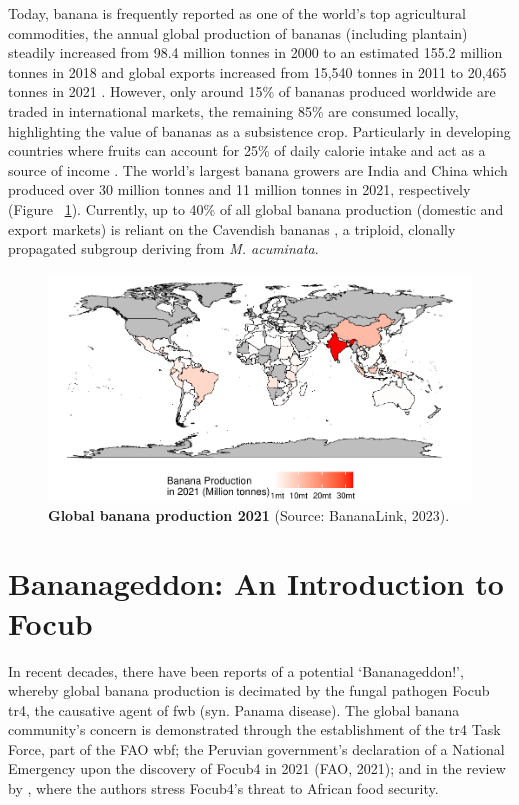 Today, banana is frequently reported as one of the world’s top agricultural commodities, the annual global production of bananas (including plantain) steadily increased from 98.4 million tonnes in 2000 to an estimated 155.2 million tonnes in 2018  and global exports increased from 15,540 tonnes in 2011 to 20,465 tonnes in 2021 \parencite{FAO2022}. However, only around 15\% of bananas produced worldwide are traded in international markets, the remaining 85\% are consumed locally, highlighting the value of bananas as a subsistence crop. Particularly in developing countries where fruits can account for 25\% of daily calorie intake and act as a source of income \parencite{FAO2019}. The world’s largest banana growers are India and China which produced over 30 million tonnes and 11 million tonnes in 2021, respectively \parencite{BananaLink2023} (Figure ~\ref{fig:bananaProdMap}).  Currently, up to 40\% of all global banana production (domestic and export markets) is reliant on the Cavendish bananas \parencite{Warman2018}, a triploid, clonally propagated subgroup deriving from \textit{M. acuminata}.

\begin{figure}[h!]
    \centering
    \includegraphics[width=15cm]{Figures/BananaProdMap.pdf}
    \caption[Global banana production, 2021]{\textbf{Global banana production 2021} (Source: BananaLink, 2023).}
    \label{fig:bananaProdMap}
\end{figure}



\section{Bananageddon: An Introduction to \acl{Focub}}

In recent decades, there have been reports of a potential ‘Bananageddon!’, whereby global banana production is decimated by the fungal pathogen \acf{Focub} \acf{tr4}, the causative agent of \acf{fwb} (syn. Panama disease). The global banana community’s concern is demonstrated through the establishment of the \acs{tr4} Task Force, part of the \ac{FAO} \ac{wbf}; the Peruvian government’s declaration of a National Emergency upon the discovery of \ac{Focub4} in 2021 (FAO, 2021); and in the review by \textcite{Westerhoven2022}, where the authors stress \ac{Focub4}'s threat to African food security.   


